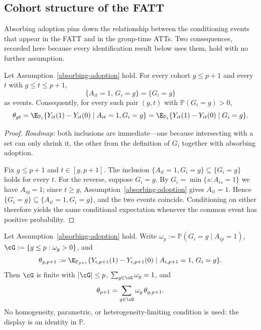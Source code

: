 \documentclass{article}
\renewcommand{\P}{\mathbb{P}}
\begin{document}
\subsection{Cohort structure of the FATT}\label{sec:cohort-structure}

Absorbing adoption pins down the relationship between the conditioning events that appear in the FATT and in the group-time ATTs. Two consequences, recorded here because every identification result below uses them, hold with no further assumption.

\begin{lemma}\label{lem:persistence}
Let Assumption~\ref{absorbing-adoption} hold. For every cohort $g \leq p+1$ and every $t$ with $g \leq t \leq p+1$,
\[
\{A_{it} = 1,\, G_i = g\} = \{G_i = g\}
\]
as events. Consequently, for every such pair $(g,t)$ with $\P(G_i = g) > 0$,
\[
\theta_{gt} = \E_{\P_t}\{Y_{it}(1) - Y_{it}(0) \mid A_{it} = 1, G_i = g\} = \E_{\P_t}\{Y_{it}(1) - Y_{it}(0) \mid G_i = g\}.
\]
\end{lemma}

\begin{proof}
\textit{Roadmap:} both inclusions are immediate---one because intersecting with a set can only shrink it, the other from the definition of $G_i$ together with absorbing adoption.

Fix $g \leq p+1$ and $t \in [g,p+1]$. The inclusion $\{A_{it}=1, G_i=g\} \subseteq \{G_i=g\}$ holds for every $t$. For the reverse, suppose $G_i = g$. By $G_i = \min\{s : A_{is}=1\}$ we have $A_{ig}=1$; since $t \geq g$, Assumption~\ref{absorbing-adoption} gives $A_{it}=1$. Hence $\{G_i=g\} \subseteq \{A_{it}=1, G_i=g\}$, and the two events coincide. Conditioning on either therefore yields the same conditional expectation whenever the common event has positive probability.
\end{proof}

\begin{lemma}\label{lem:aggregation}
Let Assumption~\ref{absorbing-adoption} hold. Write $\omega_g := \P(G_i = g \mid A_{ip}=1)$, $\cG := \{g \leq p : \omega_g > 0\}$, and
\[
\theta_{g,p+1} := \E_{\P_{p+1}}\{Y_{i,p+1}(1) - Y_{i,p+1}(0) \mid A_{i,p+1}=1,\, G_i = g\}.
\]
Then $\cG$ is finite with $|\cG| \leq p$, $\sum_{g\in\cG}\omega_g = 1$, and
\[
\theta_{p+1} = \sum_{g \in \cG} \omega_g\, \theta_{g,p+1}.
\]
No homogeneity, parametric, or heterogeneity-limiting condition is used: the display is an identity in $\P$.
\end{lemma}
\end{document}
